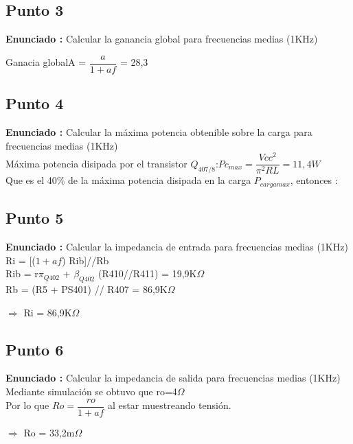 \documentclass[12pt]{book}
\begin{document}
\subsection{Punto 3}
\textbf{Enunciado : } Calcular la ganancia global para frecuencias medias (1KHz)\\
\begin{center}
Ganacia global\quad A = $\dfrac{a}{1+af}$ = 28,3
\end{center}

\subsection{Punto 4}
\textbf{Enunciado : } Calcular la máxima potencia obtenible sobre la carga para frecuencias medias (1KHz)\\[1cm]
Máxima potencia disipada por el transistor $Q_{407/8}$:\quad $Pc_{max}=\dfrac{Vcc^{2}}{\pi^{2}RL}=11,4W$\\[0,75cm]
Que es el 40\% de la máxima potencia disipada en la carga $P_{cargamax}$, entonces :
\begin{center}

\end{center}

\subsection{Punto 5}
\textbf{Enunciado : } Calcular la impedancia de entrada para frecuencias medias (1KHz)\\[1cm]
Ri = [($1+af$) Rib]//Rb\\
Rib = r$\pi_{Q402}$ + $\beta_{Q402}$ (R410//R411) = 19,9K$\Omega$\\
Rb = (R5 + PS401) // R407 = 86,9K$\Omega$
\begin{center}
$\Longrightarrow$  Ri = 86,9K$\Omega$
\end{center}

\subsection{Punto 6}
\textbf{Enunciado : } Calcular la impedancia de salida para frecuencias medias (1KHz)\\[1cm]
Mediante simulación se obtuvo que ro=4$\Omega$\\
Por lo que $Ro=\dfrac{ro}{1+af}$ al estar muestreando tensión.
\begin{center}
$\Longrightarrow$  Ro = 33,2m$\Omega$
\end{center}
\end{document}
